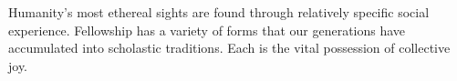 

Humanity's most ethereal sights are found through relatively specific
social experience.  Fellowship has a variety of forms that our
generations have accumulated into scholastic traditions.  Each is the
vital possession of collective joy.

\bye
